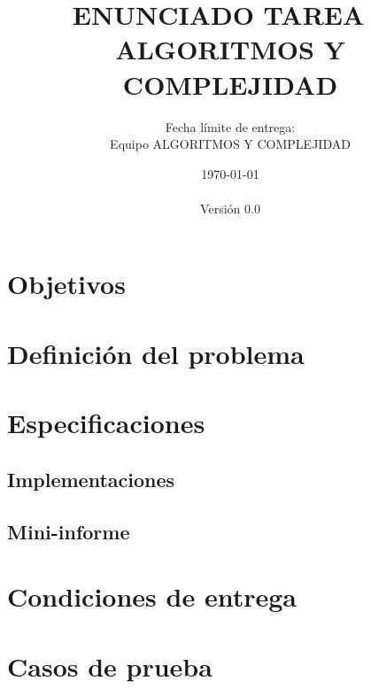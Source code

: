 \documentclass[11pt,spanish]{article}
\title{%
  \huge
  \textbf{ENUNCIADO TAREA \tnum~ \\ ALGORITMOS Y COMPLEJIDAD} \\[1ex]
  \emph{\textquote{\subtitulo}}
}
\author{%
  Fecha límite de entrega: \deadline \\[1ex]
  Equipo ALGORITMOS Y COMPLEJIDAD \sem
}
\date{%
  \small
  \today \\
  \currenttime \\[1ex]
  Versión 0.0
}
\begin{document}
\maketitle
\thispagestyle{fancy}
\vspace{-1.0\baselineskip}

\newpage

\tableofcontents

\newpage

\section{Objetivos}


\section{Definición del problema}\label{sec:problema}


\section{Especificaciones}


\subsection{Implementaciones}\label{subsec:implementaciones}


\newpage

\subsection{Mini-informe}\label{subsec:mini-informe}


\section{Condiciones de entrega}


\newpage

\appendix

\section{Casos de prueba}\label{sec:casos-prueba}

\end{document}
